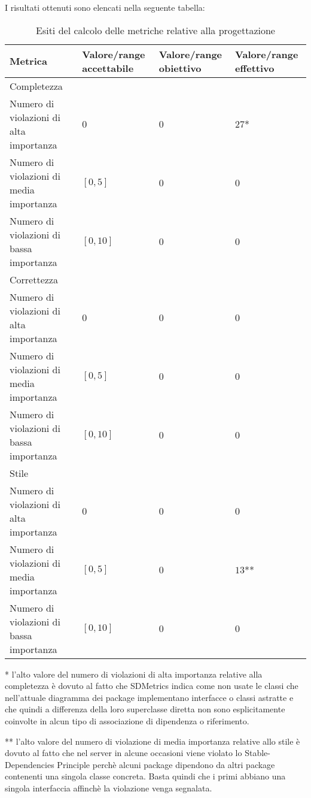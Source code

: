 		I risultati ottenuti sono elencati nella seguente tabella:
		\begin{table}[H]
		\begin{tabular}{|l|p{2.25cm}|p{2.25cm}|p{2.25cm}|}
		\hline
		\textbf{Metrica} & \textbf{Valore/range accettabile} & \textbf{Valore/range obiettivo} & \textbf{Valore/range effettivo} \\
		\hline
		Completezza & ~ & ~ & ~ \\
		Numero di violazioni di alta importanza & 0 & 0 & $27$* \\
		Numero di violazioni di media importanza & $[0, 5]$ & 0 & 0 \\
		Numero di violazioni di bassa importanza & $[0, 10]$ & 0 & 0 \\
		\hline
		Correttezza & ~ & ~ & ~ \\
		Numero di violazioni di alta importanza & 0 & 0 & 0 \\
		Numero di violazioni di media importanza & $[0, 5]$ & 0 & 0 \\
		Numero di violazioni di bassa importanza & $[0, 10]$ & 0 & 0 \\
		\hline
		Stile & ~ & ~ & ~ \\
		Numero di violazioni di alta importanza & 0 & 0 & 0 \\
		Numero di violazioni di media importanza & $[0, 5]$ & 0 & $13$** \\
		Numero di violazioni di bassa importanza & $[0, 10]$ & 0 & 0 \\
		\hline
		\end{tabular}
		\caption{Esiti del calcolo delle metriche relative alla progettazione}
		\end{table}
		
		* l'alto valore del numero di violazioni di alta importanza relative alla completezza è dovuto al fatto che SDMetrics indica come non usate le classi che nell'attuale diagramma dei package implementano interfacce o classi astratte e che quindi a differenza della loro superclasse diretta non sono esplicitamente coinvolte in alcun tipo di associazione di dipendenza o riferimento.
		
		** l'alto valore del numero di violazione di media importanza relative allo stile è dovuto al fatto che nel server in alcune occasioni viene violato lo Stable-Dependencies Principle perchè alcuni package dipendono da altri package contenenti una singola classe concreta. Basta quindi che i primi abbiano una singola interfaccia affinchè la violazione venga segnalata.

